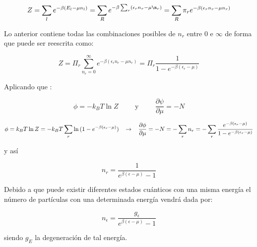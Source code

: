 \documentclass[12pt,a4paper]{article}
\begin{document}
\begin{enumerate}
\begin{equation*}
    Z = \sum_l e^{- \beta(E_l - \mu n_l)} = \sum_{R} e^{-\beta \sum_{r}(\epsilon_r n_r - \mu \n_r)} = \sum_{R} \pi_{r} e^{- \beta(\epsilon_r n_r - \mu n_r)}
\end{equation*}

Lo anterior contiene todas las combinaciones posibles de $n_r$ entre 0 e $\infty$ de forma que puede ser reescrita como:

\begin{equation*}
    Z = \Pi_{r} \sum_{n_r = 0}^{\infty} e^{-\beta(\epsilon_r n_r - \mu n_r)} = \Pi_{r} \frac{1}{1 - e ^{- \beta (\epsilon_r - \mu )}}
\end{equation*}

Aplicando que :

\begin{equation*}
    \phi = -k_B T \ln{Z} \hspace{1cm} \text{y} \hspace{1cm} \frac{\partial \psi}{\partial \mu} = -N
\end{equation*}


\begin{equation*}
    \phi = k_B T \ln{Z} = -k_B T \sum_{r} \ln{(1- e^{-\beta(\epsilon_r - \mu )})}\hspace{0.3cm} \rightarrow \hspace{0.3cm} \frac{\partial \phi}{\partial \mu}= -N  = - \sum_{r} n_r = -\sum_{r} \frac{e^{-\beta(\epsilon_r - \mu)}}{1 - e^{-\beta(\epsilon_r - \mu)}}
\end{equation*}

y así

\begin{equation*}
    n_r = \frac{1}{e^{\beta(\epsilon - \mu)} - 1}
\end{equation*}

Debido a que puede existir diferentes estados cuánticos con una misma energía el número de partículas con una determinada energía vendrá dada por:

\begin{equation*}
    n_\epsilon = \frac{g_\epsilon}{e^{\beta(\epsilon - \mu)}-1}
\end{equation*}

siendo $g_E$ la degeneración de tal energía.

    
    
\end{enumerate}
\end{document}
